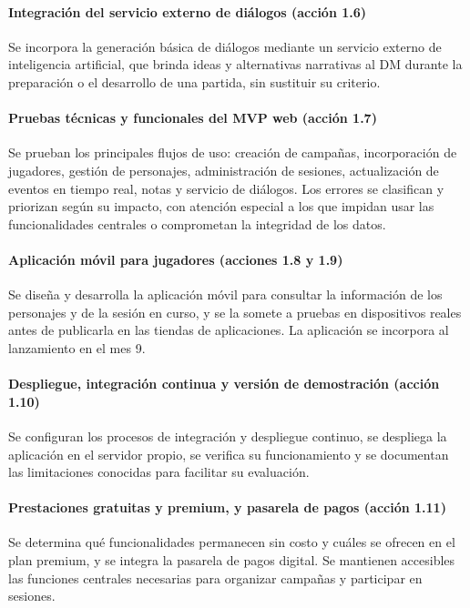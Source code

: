 \paragraph{Integración del servicio externo de diálogos (acción 1.6)}
Se incorpora la generación básica de diálogos mediante un servicio externo de inteligencia artificial, que brinda ideas y alternativas narrativas al DM durante la preparación o el desarrollo de una partida, sin sustituir su criterio.

\paragraph{Pruebas técnicas y funcionales del MVP web (acción 1.7)}
Se prueban los principales flujos de uso: creación de campañas, incorporación de jugadores, gestión de personajes, administración de sesiones, actualización de eventos en tiempo real, notas y servicio de diálogos. Los errores se clasifican y priorizan según su impacto, con atención especial a los que impidan usar las funcionalidades centrales o comprometan la integridad de los datos.

\paragraph{Aplicación móvil para jugadores (acciones 1.8 y 1.9)}
Se diseña y desarrolla la aplicación móvil para consultar la información de los personajes y de la sesión en curso, y se la somete a pruebas en dispositivos reales antes de publicarla en las tiendas de aplicaciones. La aplicación se incorpora al lanzamiento en el mes 9.

\paragraph{Despliegue, integración continua y versión de demostración (acción 1.10)}
Se configuran los procesos de integración y despliegue continuo, se despliega la aplicación en el servidor propio, se verifica su funcionamiento y se documentan las limitaciones conocidas para facilitar su evaluación.

\paragraph{Prestaciones gratuitas y premium, y pasarela de pagos (acción 1.11)}
Se determina qué funcionalidades permanecen sin costo y cuáles se ofrecen en el plan premium, y se integra la pasarela de pagos digital. Se mantienen accesibles las funciones centrales necesarias para organizar campañas y participar en sesiones.

